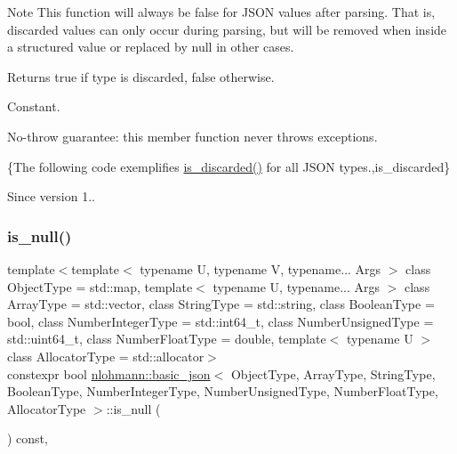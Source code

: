 \begin{DoxyNote}{Note}
This function will always be {\ttfamily false} for J\+S\+ON values after parsing. That is, discarded values can only occur during parsing, but will be removed when inside a structured value or replaced by null in other cases.
\end{DoxyNote}
\begin{DoxyReturn}{Returns}
{\ttfamily true} if type is discarded, {\ttfamily false} otherwise.
\end{DoxyReturn}
Constant.

No-\/throw guarantee\+: this member function never throws exceptions.

\{The following code exemplifies {\ttfamily \hyperlink{classnlohmann_1_1basic__json_a1002d187e05b5323bda5de124cbe95a8}{is\+\_\+discarded()}} for all J\+S\+ON types.,is\+\_\+discarded\}

\begin{DoxySince}{Since}
version 1.. 
\end{DoxySince}
\hypertarget{classnlohmann_1_1basic__json_a8abdfc0d6e051f6fa29d49da57bce631}{}\label{classnlohmann_1_1basic__json_a8abdfc0d6e051f6fa29d49da57bce631} 
\subsubsection{\texorpdfstring{is\+\_\+null()}{is\_null()}}
{\footnotesize\ttfamily template$<$template$<$ typename U, typename V, typename... Args $>$ class Object\+Type = std\+::map, template$<$ typename U, typename... Args $>$ class Array\+Type = std\+::vector, class String\+Type  = std\+::string, class Boolean\+Type  = bool, class Number\+Integer\+Type  = std\+::int64\+\_\+t, class Number\+Unsigned\+Type  = std\+::uint64\+\_\+t, class Number\+Float\+Type  = double, template$<$ typename U $>$ class Allocator\+Type = std\+::allocator$>$ \\
constexpr bool \hyperlink{classnlohmann_1_1basic__json}{nlohmann\+::basic\+\_\+json}$<$ Object\+Type, Array\+Type, String\+Type, Boolean\+Type, Number\+Integer\+Type, Number\+Unsigned\+Type, Number\+Float\+Type, Allocator\+Type $>$\+::is\+\_\+null (\begin{DoxyParamCaption}{ }\end{DoxyParamCaption}) const\hspace{0.3cm}{\ttfamily [inline]}, {\ttfamily [noexcept]}}



